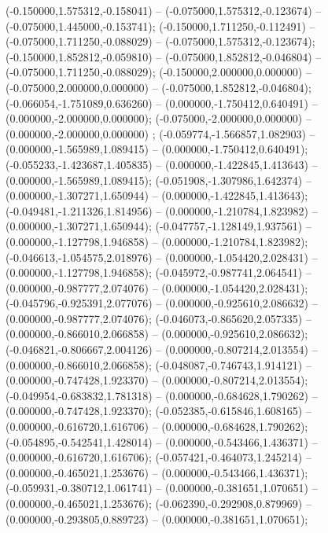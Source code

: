 (-0.150000,1.575312,-0.158041) -- (-0.075000,1.575312,-0.123674) -- (-0.075000,1.445000,-0.153741);
 (-0.150000,1.711250,-0.112491) -- (-0.075000,1.711250,-0.088029) -- (-0.075000,1.575312,-0.123674);
 (-0.150000,1.852812,-0.059810) -- (-0.075000,1.852812,-0.046804) -- (-0.075000,1.711250,-0.088029);
 (-0.150000,2.000000,0.000000) -- (-0.075000,2.000000,0.000000) -- (-0.075000,1.852812,-0.046804);
 (-0.066054,-1.751089,0.636260) -- (0.000000,-1.750412,0.640491) -- (0.000000,-2.000000,0.000000);
 (-0.075000,-2.000000,0.000000) -- (0.000000,-2.000000,0.000000) ;
 (-0.059774,-1.566857,1.082903) -- (0.000000,-1.565989,1.089415) -- (0.000000,-1.750412,0.640491);
 (-0.055233,-1.423687,1.405835) -- (0.000000,-1.422845,1.413643) -- (0.000000,-1.565989,1.089415);
 (-0.051908,-1.307986,1.642374) -- (0.000000,-1.307271,1.650944) -- (0.000000,-1.422845,1.413643);
 (-0.049481,-1.211326,1.814956) -- (0.000000,-1.210784,1.823982) -- (0.000000,-1.307271,1.650944);
 (-0.047757,-1.128149,1.937561) -- (0.000000,-1.127798,1.946858) -- (0.000000,-1.210784,1.823982);
 (-0.046613,-1.054575,2.018976) -- (0.000000,-1.054420,2.028431) -- (0.000000,-1.127798,1.946858);
 (-0.045972,-0.987741,2.064541) -- (0.000000,-0.987777,2.074076) -- (0.000000,-1.054420,2.028431);
 (-0.045796,-0.925391,2.077076) -- (0.000000,-0.925610,2.086632) -- (0.000000,-0.987777,2.074076);
 (-0.046073,-0.865620,2.057335) -- (0.000000,-0.866010,2.066858) -- (0.000000,-0.925610,2.086632);
 (-0.046821,-0.806667,2.004126) -- (0.000000,-0.807214,2.013554) -- (0.000000,-0.866010,2.066858);
 (-0.048087,-0.746743,1.914121) -- (0.000000,-0.747428,1.923370) -- (0.000000,-0.807214,2.013554);
 (-0.049954,-0.683832,1.781318) -- (0.000000,-0.684628,1.790262) -- (0.000000,-0.747428,1.923370);
 (-0.052385,-0.615846,1.608165) -- (0.000000,-0.616720,1.616706) -- (0.000000,-0.684628,1.790262);
 (-0.054895,-0.542541,1.428014) -- (0.000000,-0.543466,1.436371) -- (0.000000,-0.616720,1.616706);
 (-0.057421,-0.464073,1.245214) -- (0.000000,-0.465021,1.253676) -- (0.000000,-0.543466,1.436371);
 (-0.059931,-0.380712,1.061741) -- (0.000000,-0.381651,1.070651) -- (0.000000,-0.465021,1.253676);
 (-0.062390,-0.292908,0.879969) -- (0.000000,-0.293805,0.889723) -- (0.000000,-0.381651,1.070651);
